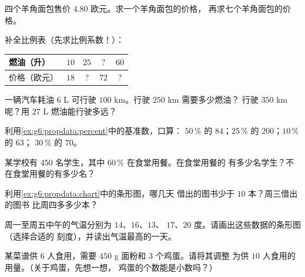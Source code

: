 \begin{exercise}[$\star$]\label{exo:g6:propdata:2}
四个羊角面包售价 $4.80$ 欧元。求一个羊角面包的价格，
再求七个羊角面包的价格。
\end{exercise}

\begin{exercise}[$\star$]\label{exo:g6:propdata:3}
补全比例表（先求比例系数！）：
\begin{center}
\renewcommand{\arraystretch}{1.2}
\begin{tabular}{l|cccc}
燃油（升） & $10$ & $25$ & $?$ & $60$ \\
\hline
价格（欧元） & $18$ & $?$ & $72$ & $?$ \\
\end{tabular}
\end{center}
\end{exercise}

\begin{exercise}[$\star$]\label{exo:g6:propdata:4}
一辆汽车耗油 $6$ L 可行驶 $100$ km。行驶 $250$ km 需要多少燃油？
行驶 $350$ km 呢？用 $27$ L 燃油能行驶多远？
\end{exercise}

\begin{exercise}[$\star$]\label{exo:g6:propdata:5}
利用\cref{ex:g6:propdata:percent}中的基准数，口算：
$50\,\%$ 的 $84$；\quad $25\,\%$ 的 $200$；\quad $10\,\%$ 的 $63$；
\quad $30\,\%$ 的 $70$。
\end{exercise}

\begin{exercise}[$\star$]\label{exo:g6:propdata:6}
某学校有 $450$ 名学生，其中 $60\,\%$ 在食堂用餐。在食堂用餐的
有多少名学生？不在食堂用餐的有多少名？
\end{exercise}

\begin{exercise}[$\star$]\label{exo:g6:propdata:7}
利用\cref{ex:g6:propdata:chart}中的条形图，哪几天
借出的图书少于 $10$ 本？周三借出的图书
比周四多多少本？
\end{exercise}

\begin{exercise}[$\star$]\label{exo:g6:propdata:8}
周一至周五中午的气温分别为 $14$、$16$、$13$、
$17$、$20$ 度。请画出这些数据的条形图（选择合适的
刻度），并读出气温最高的一天。
\end{exercise}

\begin{exercise}[$\star\star$]\label{exo:g6:propdata:9}
某菜谱供 $6$ 人食用，需要 $450$ g 面粉和 $3$ 个鸡蛋。请将其调整
为供 $10$ 人食用的用量。（关于鸡蛋，先想一想，
鸡蛋的个数能是小数吗？）
\end{exercise}

